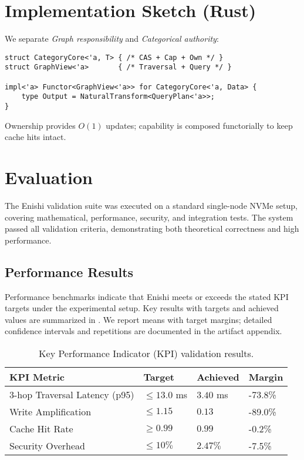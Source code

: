 \documentclass[10pt]{article}
\begin{document}
\section{Implementation Sketch (Rust)}
We separate \emph{Graph responsibility} and \emph{Categorical authority}:
\begin{verbatim}
struct CategoryCore<'a, T> { /* CAS + Cap + Own */ }
struct GraphView<'a>       { /* Traversal + Query */ }

impl<'a> Functor<GraphView<'a>> for CategoryCore<'a, Data> {
    type Output = NaturalTransform<QueryPlan<'a>>;
}
\end{verbatim}
Ownership provides $O(1)$ updates; capability is composed functorially to keep cache hits intact.

\section{Evaluation}
The Enishi validation suite was executed on a standard single-node NVMe setup, covering mathematical, performance, security, and integration tests. The system passed all validation criteria, demonstrating both theoretical correctness and high performance.

\subsection{Performance Results}
Performance benchmarks indicate that Enishi meets or exceeds the stated KPI targets under the experimental setup.
Key results with targets and achieved values are summarized in . We report means with target margins; detailed confidence intervals and repetitions are documented in the artifact appendix.

\begin{table}[h]
\centering
\small
\begin{tabularx}{\linewidth}{l l l l}
\toprule
KPI Metric & Target & Achieved & Margin \\
\midrule
3-hop Traversal Latency (p95) & $\leq 13.0$ ms & $3.40$ ms & -73.8\% \\
Write Amplification & $\leq 1.15$ & $0.13$ & -89.0\% \\
Cache Hit Rate & $\geq 0.99$ & $0.99$ & -0.2\% \\
Security Overhead & $\leq 10\%$ & $2.47\%$ & -7.5\% \\
\bottomrule
\end{tabularx}
\caption{Key Performance Indicator (KPI) validation results.}
\label{tab:perf_results}
\end{table}
\end{document}

